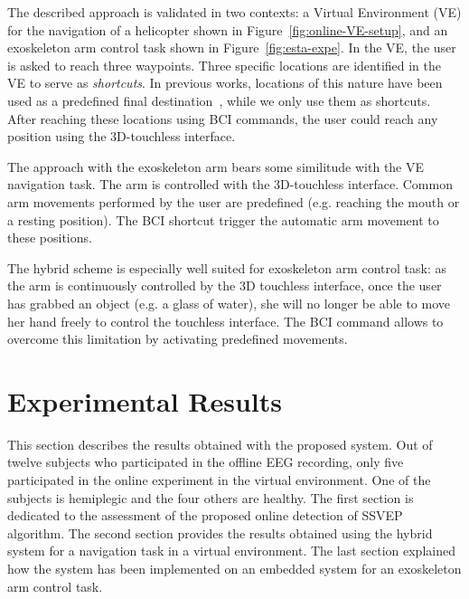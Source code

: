 The described approach is validated in two contexts: a Virtual Environment (VE) for the navigation of a helicopter shown in Figure~\ref{fig:online-VE-setup}, and an exoskeleton arm control task shown in Figure~\ref{fig:esta-expe}.
In the VE, the user is asked to reach three waypoints.
Three specific locations are identified in the VE to serve as \emph{shortcuts}. 
In previous works, locations of this nature have been used as a predefined final destination~\citep{lotte_exploring_2010}, while we only use them as shortcuts. 
After reaching these locations using BCI commands, the user could reach any position using the 3D-touchless interface. 

The approach with the exoskeleton arm bears some similitude with the VE navigation task. 
The arm is controlled with the 3D-touchless interface.
Common arm movements performed by the user are predefined (e.g. reaching the mouth or a resting position). 
The BCI shortcut trigger the automatic arm movement to these positions.
 
The hybrid scheme is especially well suited for exoskeleton arm control task: 
as the arm is continuously controlled by the 3D touchless interface, once the user has grabbed an object (e.g. a glass of water), she will no longer be able to move her hand freely to control the touchless interface. 
The BCI command allows to overcome this limitation by activating predefined movements.

\section{Experimental Results}
\label{sec:hBCI-results}
       
This section describes the results obtained with the proposed system.
Out of twelve subjects who participated in the offline EEG recording, only five participated in the online experiment in the virtual environment.
One of the subjects is hemiplegic and the four others are healthy. 
The first section is dedicated to the assessment of the proposed online detection of SSVEP algorithm.
The second section provides the results obtained using the hybrid system for a navigation task in a virtual environment.
The last section explained how the system has been implemented on an embedded system for an exoskeleton arm control task.

